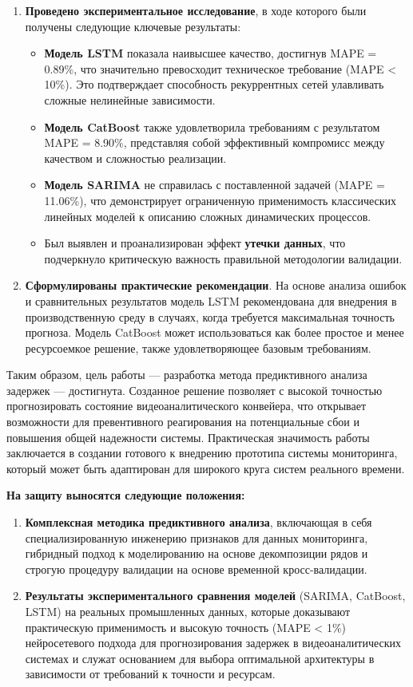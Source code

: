 \begin{enumerate}
    \item \textbf{Проведено экспериментальное исследование}, в ходе которого были получены следующие ключевые результаты:
    \begin{itemize}
        \item \textbf{Модель LSTM} показала наивысшее качество, достигнув MAPE = 0.89\%, что значительно превосходит техническое требование (MAPE < 10\%). Это подтверждает способность рекуррентных сетей улавливать сложные нелинейные зависимости.
        \item \textbf{Модель CatBoost} также удовлетворила требованиям с результатом MAPE = 8.90\%, представляя собой эффективный компромисс между качеством и сложностью реализации.
        \item \textbf{Модель SARIMA} не справилась с поставленной задачей (MAPE = 11.06\%), что демонстрирует ограниченную применимость классических линейных моделей к описанию сложных динамических процессов.
        \item Был выявлен и проанализирован эффект \textbf{утечки данных}, что подчеркнуло критическую важность правильной методологии валидации.
    \end{itemize}

    \item \textbf{Сформулированы практические рекомендации}. На основе анализа ошибок и сравнительных результатов модель LSTM рекомендована для внедрения в производственную среду в случаях, когда требуется максимальная точность прогноза. Модель CatBoost может использоваться как более простое и менее ресурсоемкое решение, также удовлетворяющее базовым требованиям.
\end{enumerate}

\hspace*{1.25cm}Таким образом, цель работы — разработка метода предиктивного анализа задержек — достигнута. Созданное решение позволяет с высокой точностью прогнозировать состояние видеоаналитического конвейера, что открывает возможности для превентивного реагирования на потенциальные сбои и повышения общей надежности системы. Практическая значимость работы заключается в создании готового к внедрению прототипа системы мониторинга, который может быть адаптирован для широкого круга систем реального времени.

\vspace{1cm}
\hspace*{1.25cm}\textbf{На защиту выносятся следующие положения:}
\begin{enumerate}
    \item \textbf{Комплексная методика предиктивного анализа}, включающая в себя специализированную инженерию признаков для данных мониторинга, гибридный подход к моделированию на основе декомпозиции рядов и строгую процедуру валидации на основе временной кросс-валидации.
    \item \textbf{Результаты экспериментального сравнения моделей} (SARIMA, CatBoost, LSTM) на реальных промышленных данных, которые доказывают практическую применимость и высокую точность (MAPE < 1\%) нейросетевого подхода для прогнозирования задержек в видеоаналитических системах и служат основанием для выбора оптимальной архитектуры в зависимости от требований к точности и ресурсам.
\end{enumerate}
